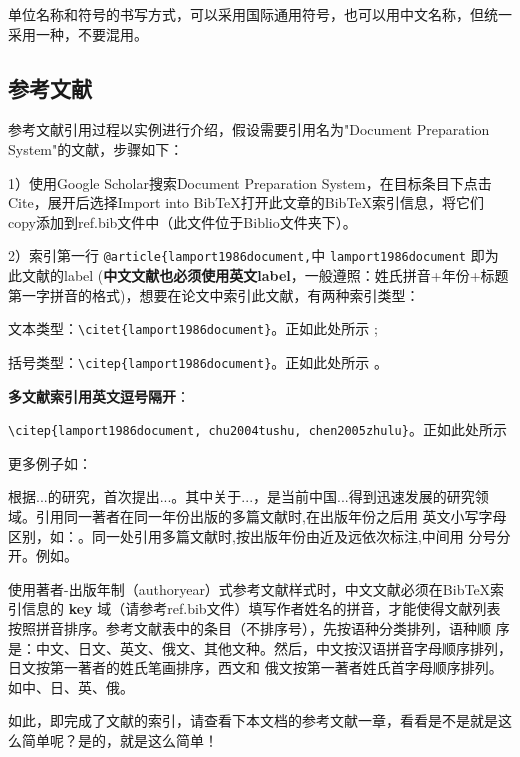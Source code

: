 单位名称和符号的书写方式，可以采用国际通用符号，也可以用中文名称，但统一采用一种，不要混用。

\subsection{参考文献}

参考文献引用过程以实例进行介绍，假设需要引用名为"Document Preparation System"的文献，步骤如下：

1）使用Google Scholar搜索Document Preparation System，在目标条目下点击Cite，展开后选择Import into BibTeX打开此文章的BibTeX索引信息，将它们copy添加到ref.bib文件中（此文件位于Biblio文件夹下）。

2）索引第一行 \verb|@article{lamport1986document,|中 \verb|lamport1986document| 即为此文献的label (\textbf{中文文献也必须使用英文label}，一般遵照：姓氏拼音+年份+标题第一字拼音的格式)，想要在论文中索引此文献，有两种索引类型：

文本类型：\verb|\citet{lamport1986document}|。正如此处所示 \citet{lamport1986document}; 

括号类型：\verb|\citep{lamport1986document}|。正如此处所示 \citep{lamport1986document}。

\textbf{多文献索引用英文逗号隔开}：

\verb|\citep{lamport1986document, chu2004tushu, chen2005zhulu}|。正如此处所示 \citep{lamport1986document,chu2004tushu,chen2005zhulu}

更多例子如：

\citet{walls2013drought}根据...的研究，首次提出...。其中关于...\citep{walls2013drought}，是当前中国...得到迅速发展的研究领域\citep{chen1980zhongguo}。引用同一著者在同一年份出版的多篇文献时,在出版年份之后用
英文小写字母区别，如：\citep{yuan2012lana,yuan2012lanb,yuan2012lanc}。同一处引用多篇文献时,按出版年份由近及远依次标注,中间用
分号分开。例如\citep{chen1980zhongguo,stamerjohanns2009mathml,hls2012jinji,niu2013zonghe}。

使用著者-出版年制（authoryear）式参考文献样式时，中文文献必须在BibTeX索引信息的 \textbf{key} 域（请参考ref.bib文件）填写作者姓名的拼音，才能使得文献列表按照拼音排序。参考文献表中的条目（不排序号），先按语种分类排列，语种顺 序是：中文、日文、英文、俄文、其他文种。然后，中文按汉语拼音字母顺序排列，日文按第一著者的姓氏笔画排序，西文和 俄文按第一著者姓氏首字母顺序排列。如中\cite{niu2013zonghe}、日\cite{Bohan1928}、英\cite{stamerjohanns2009mathml}、俄\cite{Dubrovin1906}。

如此，即完成了文献的索引，请查看下本文档的参考文献一章，看看是不是就是这么简单呢？是的，就是这么简单！

